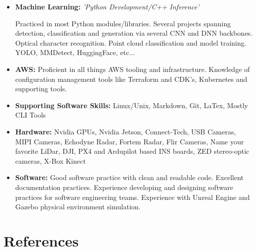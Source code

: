 \documentclass[11pt,a4paper,sans]{moderncv}        %
\begin{document}
\begin{itemize}

\item{\textbf{Machine Learning:} \textit{'Python Development/C++ Inference'}

\vspace{3pt}

\small{ Practiced in most Python modules/libraries. Several projects spanning detection, classification and generation via several CNN and DNN backbones. Optical character recognition. Point cloud classification and model training. YOLO, MMDetect, HuggingFace, etc...}}

\vspace{5pt}

\item{\textbf{AWS:}\small{ Proficient in all things AWS tooling and infrastructure. Knowledge of configuration management tools like Terraform and CDK's, Kubernetes and supporting tools. }}

\vspace{5pt}

\item \textbf{Supporting Software Skills:} Linux/Unix, Markdown, Git, LaTex, Mostly CLI Tools

\vspace{5pt}

\item \textbf{Hardware:} Nvidia GPUs, Nvidia Jetson, Connect-Tech, USB Cameras, MIPI Cameras, Echodyne Radar, Fortem Radar, Flir Cameras, Name your favorite LiDar, DJI, PX4 and Ardupilot based INS boards, ZED stereo-optic cameras, X-Box Kinect

\item \textbf{Software:} Good software practice with clean and readable code. Excellent documentation practices. Experience developing and designing software practices for software engineering teams. Experience with Unreal Engine and Gazebo physical environment simulation. 


\end{itemize}

\section{References}

\vspace{1pt}
 
\end{document}
